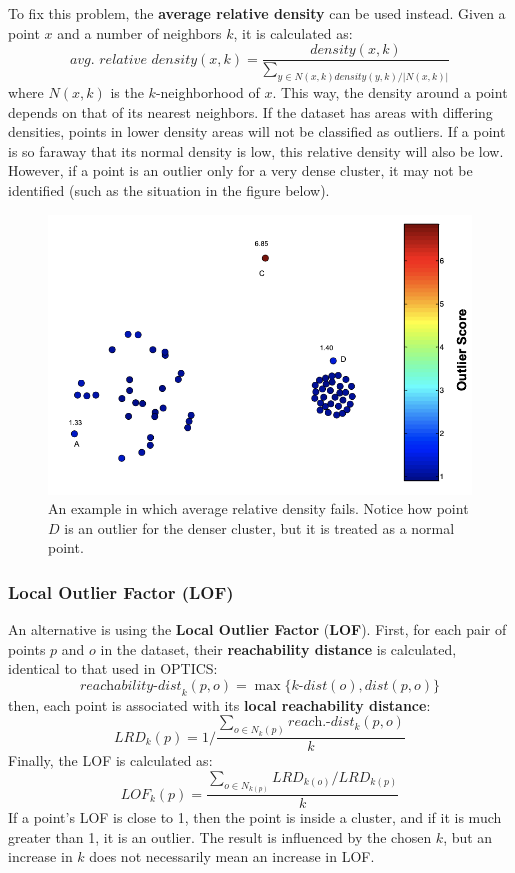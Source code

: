To fix this problem, the \textbf{average relative density} can be used instead. Given a point $x$ and a number of neighbors $k$, it is calculated as:
\begin{equation*}
    \textit{avg. relative density}(x,k) = \dfrac{\textit{density}(x,k)}{\sum_{y \in N(x,k) \textit{density}(y,k)/|N(x,k)|}}
\end{equation*}
where $N(x,k)$ is the $k$-neighborhood of $x$. This way, the density around a point depends on that of its nearest neighbors. If the dataset has areas with differing densities, points in lower density areas will not be classified as outliers. If a point is so faraway that its normal density is low, this relative density will also be low. However, if a point is an outlier only for a very dense cluster, it may not be identified (such as the situation in the figure below).
\begin{figure}[ht]
    \centering
    \includegraphics[width=0.5\linewidth]{img/relative_density.png}
    \caption{An example in which average relative density fails. Notice how point $D$ is an outlier for the denser cluster, but it is treated as a normal point.}
    \label{fig:relative-dist}
\end{figure}

\subsubsection{Local Outlier Factor (LOF)}

An alternative is using the \textbf{Local Outlier Factor} (\textbf{LOF}). First, for each pair of points $p$ and $o$ in the dataset, their \textbf{reachability distance} is calculated, identical to that used in OPTICS:
\begin{equation*}
    \textit{reachability-dist}_k(p,o) = \max \{\textit{k-dist}(o), \textit{dist}(p,o)\}
\end{equation*}
then, each point is associated with its \textbf{local reachability distance}:
\begin{equation*}
    \textit{LRD}_k(p) = 1 / \dfrac{\sum_{o \in \textit{N}_k(p)} \textit{reach.-dist}_k(p,o)}{k}
\end{equation*}
Finally, the LOF is calculated as:
\begin{equation*}
    \textit{LOF}_{\textit{k}}(p) = \dfrac{\sum_{o \in N_{k(p)}} \textit{LRD}_{k(o)} / \textit{LRD}_{k(p)} }{k}
\end{equation*}
If a point's LOF is close to 1, then the point is inside a cluster, and if it is much greater than 1, it is an outlier. The result is influenced by the chosen $k$, but an increase in $k$ does not necessarily mean an increase in LOF.

